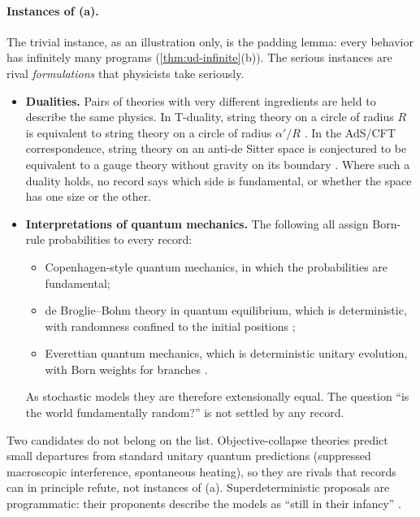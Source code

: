 \paragraph{Instances of (a).}
The trivial instance, as an illustration only, is the padding lemma: every behavior has
infinitely many programs (\cref{thm:ud-infinite}(b)). The serious instances are rival \emph{formulations} that
physicists take seriously.
\begin{itemize}
  \item \textbf{Dualities.} Pairs of theories with very different ingredients are held to
        describe the same physics. In T-duality, string theory on a circle of radius
        $R$ is equivalent to string theory on a circle of radius $\alpha'/R$
        \citep{polchinski1998}. In the AdS/CFT correspondence, string theory on an
        anti-de Sitter space is conjectured to be equivalent to a gauge theory without
        gravity on its boundary \citep{maldacena1998}. Where such a duality holds, no
        record says which side is fundamental, or whether the space has one size or the
        other.
  \item \textbf{Interpretations of quantum mechanics.} The following all assign Born-rule
        probabilities to every record:
        \begin{itemize}
          \item Copenhagen-style quantum mechanics, in which the probabilities are
                fundamental;
          \item de Broglie--Bohm theory in quantum equilibrium, which is deterministic,
                with randomness confined to the initial positions
                \citep{bohm1952,dgz1992};
          \item Everettian quantum mechanics, which is deterministic unitary evolution,
                with Born weights for branches \citep{everett1957,wallace2012}.
        \end{itemize}
        As stochastic models they are therefore extensionally equal. The question ``is
        the world fundamentally random?'' is not settled by any record.
\end{itemize}
Two candidates do not belong on the list. Objective-collapse theories \citep{grw1986}
predict small departures from standard unitary quantum predictions (suppressed
macroscopic interference, spontaneous heating), so they are rivals that records can in
principle refute, not instances of (a). Superdeterministic proposals are programmatic:
their proponents describe the models as ``still in their infancy''
\citep[Sec.~5]{hossenfelder-palmer2020}.

